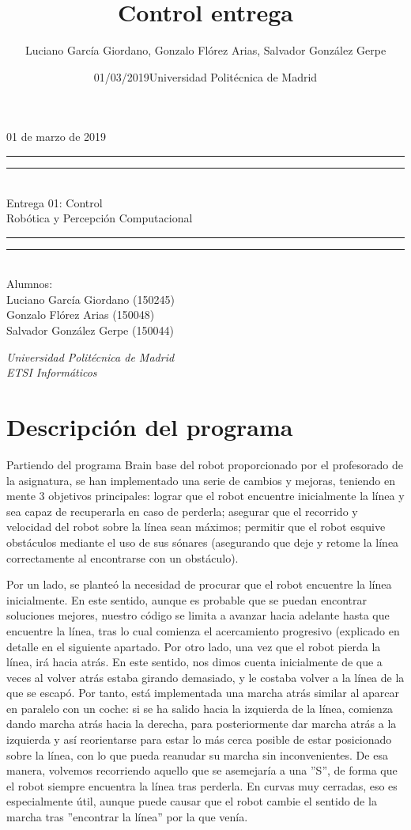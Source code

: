 \documentclass{article}
\title{Control entrega}
\author{Luciano García Giordano, Gonzalo Flórez Arias, Salvador González Gerpe}
\date{01/03/2019}
\date{Universidad Politécnica de Madrid}
\newcommand*{\frontPageEC}[2]{
    \begingroup %
        \centering %
        \vspace*{\baselineskip} %
        {\begin{flushright} \LARGE #1  \end{flushright}}
        \vspace*{\baselineskip}
        \rule{\textwidth}{1.6pt}\vspace*{-\baselineskip}\vspace*{2pt} %
        \rule{\textwidth}{0.4pt}\\[\baselineskip] %
        {\LARGE #2  \\[0.8\baselineskip] \large{Robótica y Percepción Computacional}}\\[0.2\baselineskip] %
        \rule{\textwidth}{0.4pt}\vspace*{-\baselineskip}\vspace{3.2pt} %
        \rule{\textwidth}{1.6pt}\\[\baselineskip] %
        \vspace*{2\baselineskip} %
        Alumnos: \\[\baselineskip]
        {\Large Luciano García Giordano (150245)} \\
        {\Large Gonzalo Flórez Arias (150048)} \\
        {\Large Salvador González Gerpe (150044)} \\
        
        \vfill
        
        {\itshape Universidad Politécnica de Madrid \\ ETSI Informáticos\par} %
    \endgroup}
\begin{document}
\frontPageEC{01 de marzo de 2019}{Entrega 01: Control}
\thispagestyle{empty}

\newpage
\tableofcontents
\setcounter{page}{1}

\clearpage
\newpage



\section{Descripción del programa}
Partiendo del programa Brain base del robot proporcionado por el profesorado de la asignatura, se han implementado una serie de cambios y mejoras, teniendo en mente 3 objetivos principales: lograr que el robot encuentre inicialmente la línea y sea capaz de recuperarla en caso de perderla; asegurar que el recorrido y velocidad del robot sobre la línea sean máximos; permitir que el robot esquive obstáculos mediante el uso de sus sónares (asegurando que deje y retome la línea correctamente al encontrarse con un obstáculo).

Por un lado, se planteó la necesidad de procurar que el robot encuentre la línea inicialmente. En este sentido, aunque es probable que se puedan encontrar soluciones mejores, nuestro código se limita a avanzar hacia adelante hasta que encuentre la línea, tras lo cual comienza el acercamiento progresivo (explicado en detalle en el siguiente apartado. Por otro lado, una vez que el robot pierda la línea, irá hacia atrás. En este sentido, nos dimos cuenta inicialmente de que a veces al volver atrás estaba girando demasiado, y le costaba volver a la línea de la que se escapó. Por tanto, está implementada una marcha atrás similar al aparcar en paralelo con un coche: si se ha salido hacia la izquierda de la línea, comienza dando marcha atrás hacia la derecha, para posteriormente dar marcha atrás a la izquierda y así reorientarse para estar lo más cerca posible de estar posicionado sobre la línea, con lo que pueda reanudar su marcha sin inconvenientes. De esa manera, volvemos recorriendo aquello que se asemejaría a una ''S'', de forma que el robot siempre encuentra la línea tras perderla. En curvas muy cerradas, eso es especialmente útil, aunque puede causar que el robot cambie el sentido de la marcha tras ''encontrar la línea'' por la que venía.
\end{document}
